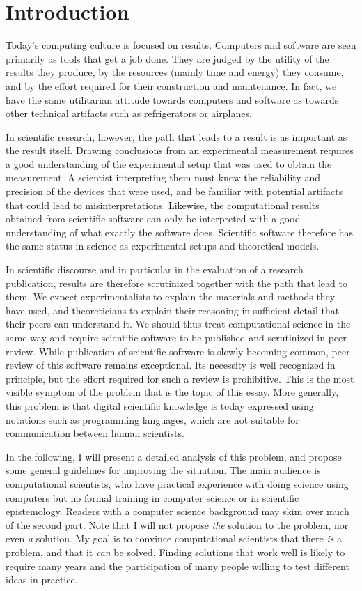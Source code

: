 \section{Introduction}

Today's computing culture is focused on results. Computers and software are seen primarily as tools that get a job done. They are judged by the utility of the results they produce, by the resources (mainly time and energy) they consume, and by the effort required for their construction and maintenance. In fact, we have the same utilitarian attitude towards computers and software as towards other technical artifacts such as refrigerators or airplanes.

In scientific research, however, the path that leads to a result is as important as the result itself. Drawing conclusions from an experimental measurement requires a good understanding of the experimental setup that was used to obtain the measurement. A scientist interpreting them must know the reliability and precision of the devices that were used, and be familiar with potential artifacts that could lead to misinterpretations. Likewise, the computational results obtained from scientific software can only be interpreted with a good understanding of what exactly the software does. Scientific software therefore has the same status in science as experimental setups and theoretical models.

In scientific discourse and in particular in the evaluation of a research publication, results are therefore scrutinized together with the path that lead to them. We expect experimentalists to explain the materials and methods they have used, and theoreticians to explain their reasoning in sufficient detail that their peers can understand it. We should thus treat computational science in the same way and require scientific software to be published and scrutinized in peer review. While publication of scientific software is slowly becoming common, peer review of this software remains exceptional. Its necessity is well recognized in principle, but the effort required for such a review is prohibitive. This is the most visible symptom of the problem that is the topic of this essay. More generally, this problem is that digital scientific knowledge is today expressed using notations such as programming languages, which are not suitable for communication between human scientists.

In the following, I will present a detailed analysis of this problem, and propose some general guidelines for improving the situation. The main audience is computational scientists, who have practical experience with doing science using computers but no formal training in computer science or in scientific epistemology. Readers with a computer science background may skim over much of the second part. Note that I will not propose \textit{the} solution to the problem, nor even \textit{a} solution. My goal is to convince computational scientists that there \textit{is} a problem, and that it \textit{can} be solved. Finding solutions that work well is likely to require many years and the participation of many people willing to test different ideas in practice.

